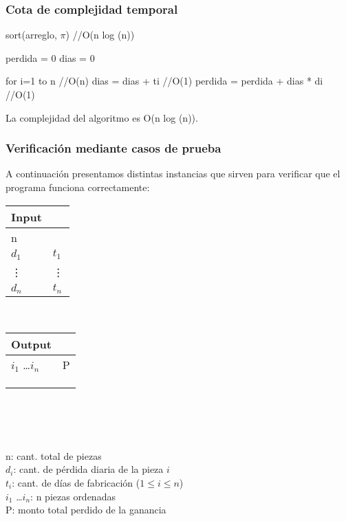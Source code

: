 \documentclass[11pt, a4paper, twoside]{article}
\begin{document}
\subsubsection{Cota de complejidad temporal}
sort(arreglo, $\pi$) //O(n log (n))

perdida = 0
dias = 0

for i=1 to n    //O(n)
    dias = dias + ti    //O(1)
    perdida = perdida + dias * di   //O(1)

La complejidad del algoritmo es O(n log (n)).


\subsubsection{Verificación mediante casos de prueba}

A continuación presentamos distintas instancias que sirven para verificar que el programa funciona correctamente: \\ 

\begin{minipage}{0.2\textwidth}
	\begin{tabular}{ll}
		Input  \\
		\hline
		n &  \\
		$d_1$ & $t_1$ \\
		\vdots & \vdots \\
		$d_n$ & $t_n$ 
	\end{tabular} \\ 
\end{minipage}
\begin{minipage}{0.2\textwidth}
	\begin{tabular}{ll}
		Output  \\
		\hline
		$i_1$ \dots $i_n$ & P \\
		 \\
		 \\
		 \\
	\end{tabular} \\ 
\end{minipage}  \\
\\
n: cant. total de piezas  \\
$d_i$: cant. de pérdida diaria de la pieza $i$ \\
$t_i$: cant. de días de fabricación ($1 \le i \le n$) \\
$i_1$ \dots $i_n$: n piezas ordenadas \\
P: monto total perdido de la ganancia \\
\end{document}
